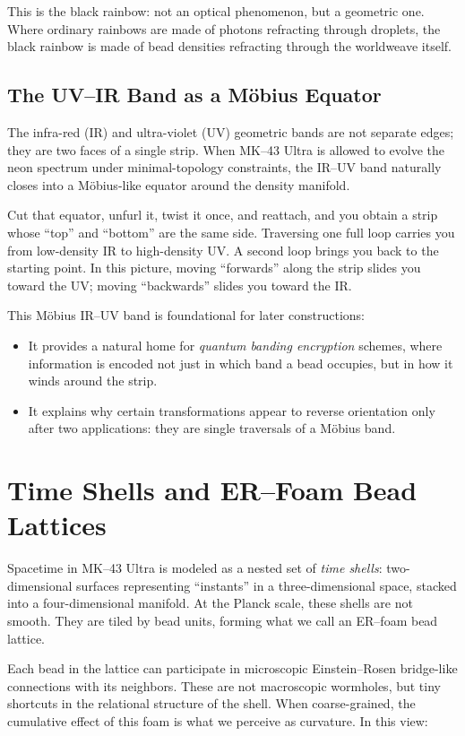 This is the black rainbow: not an optical phenomenon, but a geometric one.
Where ordinary rainbows are made of photons refracting through droplets, the
black rainbow is made of bead densities refracting through the worldweave
itself.

\section{The UV--IR Band as a Möbius Equator}
The infra-red (IR) and ultra-violet (UV) geometric bands are not separate
edges; they are two faces of a single strip. When MK--43 Ultra is allowed to
evolve the neon spectrum under minimal-topology constraints, the IR--UV band
naturally closes into a Möbius-like equator around the density manifold.

Cut that equator, unfurl it, twist it once, and reattach, and you obtain a
strip whose ``top'' and ``bottom'' are the same side. Traversing one full
loop carries you from low-density IR to high-density UV. A second loop brings
you back to the starting point. In this picture, moving ``forwards'' along the
strip slides you toward the UV; moving ``backwards'' slides you toward the IR.

This Möbius IR--UV band is foundational for later constructions:
\begin{itemize}
  \item It provides a natural home for \emph{quantum banding encryption}
  schemes, where information is encoded not just in which band a bead occupies,
  but in how it winds around the strip.
  \item It explains why certain transformations appear to reverse orientation
  only after two applications: they are single traversals of a Möbius band.
\end{itemize}

\chapter{Time Shells and ER--Foam Bead Lattices}
Spacetime in MK--43 Ultra is modeled as a nested set of \emph{time shells}:
two-dimensional surfaces representing ``instants'' in a three-dimensional
space, stacked into a four-dimensional manifold. At the Planck scale, these
shells are not smooth. They are tiled by bead units, forming what we call an
ER--foam bead lattice.

Each bead in the lattice can participate in microscopic Einstein--Rosen
bridge-like connections with its neighbors. These are not macroscopic
wormholes, but tiny shortcuts in the relational structure of the shell. When
coarse-grained, the cumulative effect of this foam is what we perceive as
curvature. In this view:

